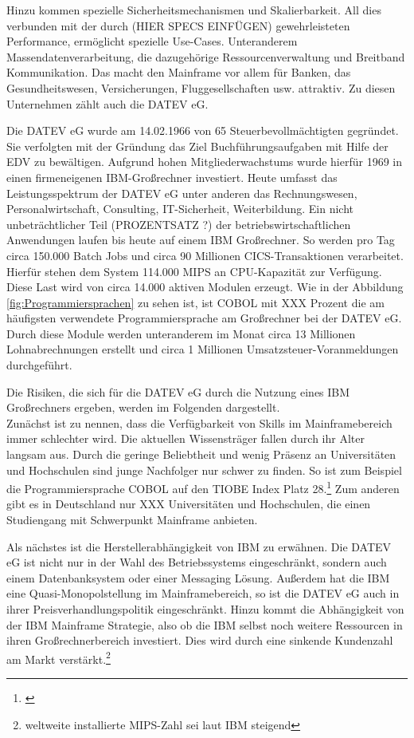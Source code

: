Hinzu kommen spezielle Sicherheitsmechanismen und Skalierbarkeit.
All dies verbunden mit der durch (HIER SPECS EINFÜGEN) gewehrleisteten Performance, ermöglicht spezielle Use-Cases.
Unteranderem Massendatenverarbeitung, die dazugehörige Ressourcenverwaltung und Breitband Kommunikation.
Das macht den Mainframe vor allem für Banken, das Gesundheitswesen, Versicherungen, Fluggesellschaften usw. attraktiv.
Zu diesen Unternehmen zählt auch die DATEV eG.
\cite{IBM.2014}

Die DATEV eG wurde am 14.02.1966 von 65 Steuerbevollmächtigten gegründet.
Sie verfolgten mit der Gründung das Ziel Buchführungsaufgaben mit Hilfe der EDV zu bewältigen.
Aufgrund hohen Mitgliederwachstums wurde hierfür 1969 in einen firmeneigenen IBM-Großrechner investiert.\cite{DATEVeG.2017}
Heute umfasst das Leistungsspektrum der DATEV eG unter anderen das Rechnungswesen, Personalwirtschaft, Consulting, IT-Sicherheit, Weiterbildung.
Ein nicht unbeträchtlicher Teil (PROZENTSATZ ?) der betriebswirtschaftlichen Anwendungen laufen bis heute auf einem IBM Großrechner.
So werden pro Tag circa 150.000 Batch Jobs und circa 90 Millionen CICS-Transaktionen verarbeitet.
Hierfür stehen dem System 114.000 MIPS an CPU-Kapazität zur Verfügung.
Diese Last wird von circa 14.000 aktiven Modulen erzeugt.
Wie in der Abbildung \ref{fig:Programmiersprachen} zu sehen ist, ist COBOL mit XXX Prozent die am häufigsten verwendete Programmiersprache am Großrechner bei der DATEV eG.
Durch diese Module werden unteranderem im Monat circa 13 Millionen Lohnabrechnungen erstellt und circa 1 Millionen Umsatzsteuer-Voranmeldungen durchgeführt.

Die Risiken, die sich für die DATEV eG durch die Nutzung eines IBM Großrechners ergeben, werden im Folgenden dargestellt.\\
Zunächst ist zu nennen, dass die Verfügbarkeit von Skills im Mainframebereich immer schlechter wird.
Die aktuellen Wissensträger fallen durch ihr Alter langsam aus.
Durch die geringe Beliebtheit und wenig Präsenz an Universitäten und Hochschulen sind junge Nachfolger nur schwer zu finden.
So ist zum Beispiel die Programmiersprache COBOL auf den TIOBE Index Platz 28.\footnote{\cite{TIOBESoftwareBV.25.11.2019}}
Zum anderen gibt es in Deutschland nur XXX Universitäten und Hochschulen, die einen Studiengang mit Schwerpunkt Mainframe anbieten.\cite{fehlt noch}

Als nächstes ist die Herstellerabhängigkeit von IBM zu erwähnen.
Die DATEV eG ist nicht nur in der Wahl des Betriebssystems eingeschränkt, sondern auch einem Datenbanksystem oder einer Messaging Lösung.
Außerdem hat die IBM eine Quasi-Monopolstellung\cite{fehlt noch} im Mainframebereich, so ist die DATEV eG auch in ihrer Preisverhandlungspolitik eingeschränkt.
Hinzu kommt die Abhängigkeit von der IBM Mainframe Strategie, also ob die IBM selbst noch weitere Ressourcen in ihren Großrechnerbereich investiert.
Dies wird durch eine sinkende Kundenzahl am Markt verstärkt.\footnote{weltweite installierte MIPS-Zahl sei laut IBM steigend}

